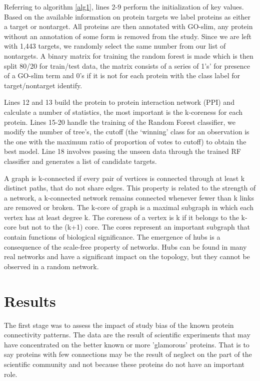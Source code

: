 \documentclass[a4paper,8pt,twocolumn,5p]{elsarticle}
\begin{document}
Referring to algorithm \ref{alg1}, lines 2-9 perform the initialization of key values. Based on the available information on protein targets we label proteins as either a target or nontarget. All proteins are then annotated with GO-slim, any protein without an annotation of some form is removed from the study. Since we are left with 1,443 targets, we randomly select the same number from our list of nontargets. A binary matrix for training the random forest is made which is then split 80/20 for train/test data, the matrix consists of a series of 1's' for presence of a GO-slim term and 0's if it is not for each protein with the class label for target/nontarget identify.

Lines 12 and 13 build the protein to protein interaction network (PPI) and calculate a number of statistics, the most important is the k-coreness for each protein. Lines 15-20 handle the training of the Random Forest classifier, we modify the number of tree's, the cutoff (the ‘winning’ class for an observation is the one with the maximum ratio of proportion of votes to cutoff) to obtain the best model. Line 18 involves passing the unseen data through the trained RF classifier and generates a list of candidate targets. 

A graph is k-connected if every pair of vertices is connected through at least k distinct paths, that do not share edges. This property is related to the strength of a network, a k-connected network remains connected whenever fewer than k links are removed or broken. The k-core of graph is a maximal subgraph in which each vertex has at least degree k. The coreness of a vertex is k if it belongs to the k-core but not to the (k+1) core. The cores represent an important subgraph that contain functions of biological significance. The emergence of hubs is a consequence of the scale-free property of networks. Hubs can be found in many real networks and have a significant impact on the topology, but they cannot be observed in a random network.


\section{Results}
The first stage was to assess the impact of study bias of the known protein connectivity patterns. The data are the result of scientific experiments that may have concentrated on the better known or more  'glamorous' proteins. That is to say proteins with few connections may be the result of neglect on the part of the scientific community and not because these proteins do not have an important role.
\end{document}
